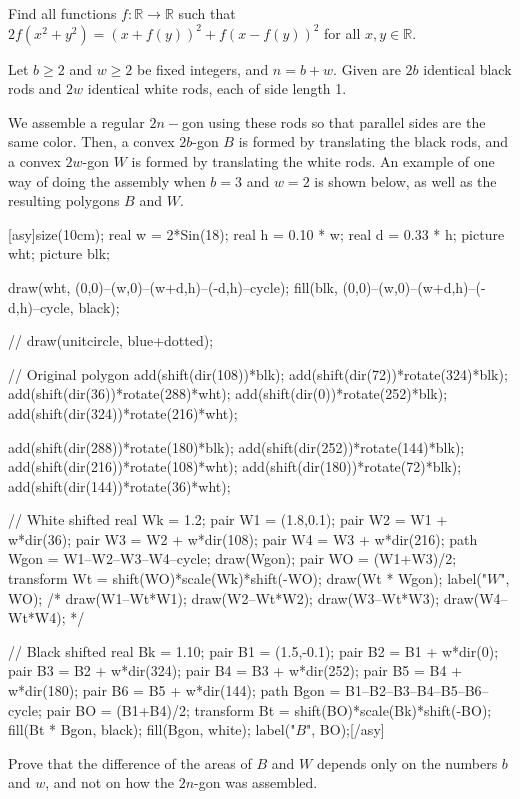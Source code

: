 \documentclass[11pt]{scrartcl}
\begin{document}
\begin{problem}[951015231425815]
	Find all functions $f:\mathbb{R}\rightarrow\mathbb{R}$ such that $2f(x^2+y^2)=(x+f(y))^2+f(x-f(y))^2$ for all $x,y\in\mathbb{R}$.
\end{problem}
\begin{problem}[2594275832195659804]
Let $b\geq2$ and $w\geq2$ be fixed integers, and $n=b+w$. Given are $2b$ identical black rods and $2w$ identical white rods, each of side length 1.

We assemble a regular $2n-$gon using these rods so that parallel sides are the same color. Then, a convex $2b$-gon $B$ is formed by translating the black rods, and a convex $2w$-gon $W$ is formed by translating the white rods. An example of one way of doing the assembly when $b=3$ and $w=2$ is shown below, as well as the resulting polygons $B$ and $W$.

[asy]size(10cm);
real w = 2*Sin(18);
real h = 0.10 * w;
real d = 0.33 * h;
picture wht;
picture blk;

draw(wht, (0,0)--(w,0)--(w+d,h)--(-d,h)--cycle);
fill(blk, (0,0)--(w,0)--(w+d,h)--(-d,h)--cycle, black);

// draw(unitcircle, blue+dotted);

// Original polygon
add(shift(dir(108))*blk);
add(shift(dir(72))*rotate(324)*blk);
add(shift(dir(36))*rotate(288)*wht);
add(shift(dir(0))*rotate(252)*blk);
add(shift(dir(324))*rotate(216)*wht);

add(shift(dir(288))*rotate(180)*blk);
add(shift(dir(252))*rotate(144)*blk);
add(shift(dir(216))*rotate(108)*wht);
add(shift(dir(180))*rotate(72)*blk);
add(shift(dir(144))*rotate(36)*wht);

// White shifted
real Wk = 1.2;
pair W1 = (1.8,0.1);
pair W2 = W1 + w*dir(36);
pair W3 = W2 + w*dir(108);
pair W4 = W3 + w*dir(216);
path Wgon = W1--W2--W3--W4--cycle;
draw(Wgon);
pair WO = (W1+W3)/2;
transform Wt = shift(WO)*scale(Wk)*shift(-WO);
draw(Wt * Wgon);
label("$W$", WO);
/*
draw(W1--Wt*W1);
draw(W2--Wt*W2);
draw(W3--Wt*W3);
draw(W4--Wt*W4);
*/

// Black shifted
real Bk = 1.10;
pair B1 = (1.5,-0.1);
pair B2 = B1 + w*dir(0);
pair B3 = B2 + w*dir(324);
pair B4 = B3 + w*dir(252);
pair B5 = B4 + w*dir(180);
pair B6 = B5 + w*dir(144);
path Bgon = B1--B2--B3--B4--B5--B6--cycle;
pair BO = (B1+B4)/2;
transform Bt = shift(BO)*scale(Bk)*shift(-BO);
fill(Bt * Bgon, black);
fill(Bgon, white);
label("$B$", BO);[/asy]

Prove that the difference of the areas of $B$ and $W$ depends only on the numbers $b$ and $w$, and not on how the $2n$-gon was assembled.
\end{problem}
\end{document}
